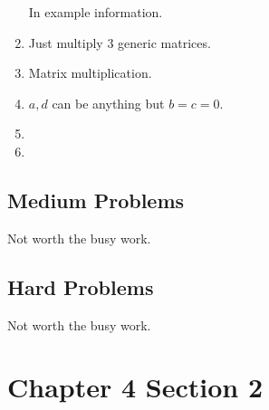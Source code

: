 \documentclass[11pt]{article}
\begin{document}
\begin{enumerate}
    In example information.
    
    \item
    
    Just multiply $3$ generic matrices.
    
    \item
    
    Matrix multiplication.
    
    \item
    
    $a,d$ can be anything but $b=c=0.$
    
    \item
    
    
    
    \item
    
\end{enumerate}

\subsection{Medium Problems}

Not worth the busy work.

\subsection{Hard Problems}

Not worth the busy work.

\section{Chapter 4 Section 2}
\end{document}
